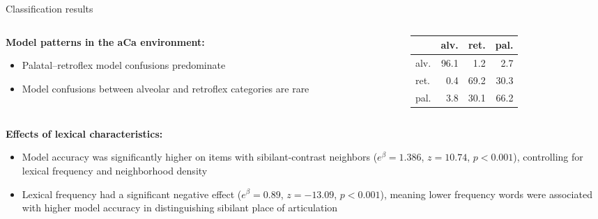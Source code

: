 \documentclass[serif, mathserif, final, xcolor=table]{beamer}
\newcommand{\colsep}{\hspace{1.5em}}
\begin{document}
\begin{frame}[t]{}
\begin{columns}[t]
\begin{column}{0.72\linewidth}
\begin{columns}[t]
\begin{column}{0.485\linewidth}
\begin{block}{Classification results}
            \begin{columns}
              \begin{column}{0.45\linewidth}
                \textbf{Model patterns in the aCa environment:}
                \begin{itemize}                
                  \item Palatal--retroflex model confusions predominate
                  \item Model confusions between alveolar and retroflex categories are rare
                \end{itemize}
              \end{column}
              \begin{column}{0.55\linewidth}
                
                \bigskip
                \bigskip

              \Large
            \begin{tabular}{lrrr}
              \toprule
            & \colsep alv. & \colsep ret. & \colsep pal. \\
            \midrule
            alv.    & 96.1 & 1.2  & 2.7  \\
            ret.    & 0.4  & 69.2 & 30.3 \\
            pal.    & 3.8  & 30.1 & 66.2 \\
            \bottomrule
            \end{tabular}
              \end{column}
            \end{columns}

            \bigskip
            \bigskip
            
            \textbf{Effects of lexical characteristics:}
            \begin{itemize}
              \item Model accuracy was significantly higher on items with sibilant-contrast neighbors ($e^\beta = 1.386$, $z = 10.74$, $p < 0.001$), controlling for lexical frequency and neighborhood density
              \item Lexical frequency had a significant negative effect ($e^\beta = 0.89$, $z = -13.09$, $p < 0.001$), meaning lower frequency words were associated with higher model accuracy in distinguishing sibilant place of articulation
            \end{itemize}

            \bigskip

          \end{block}
       

\end{column}
\end{columns}
\end{column}
\end{columns}
\end{frame}
\end{document}
